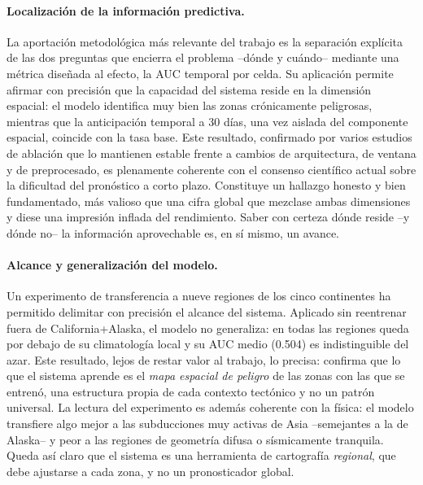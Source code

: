 \paragraph{Localización de la información predictiva.} La aportación metodológica más relevante
del trabajo es la separación explícita de las dos preguntas que encierra el problema --dónde y
cuándo-- mediante una métrica diseñada al efecto, la AUC temporal por celda. Su aplicación
permite afirmar con precisión que la capacidad del sistema reside en la dimensión espacial: el
modelo identifica muy bien las zonas crónicamente peligrosas, mientras que la anticipación
temporal a 30 días, una vez aislada del componente espacial, coincide con la tasa base. Este
resultado, confirmado por varios estudios de ablación que lo mantienen estable frente a cambios
de arquitectura, de ventana y de preprocesado, es plenamente coherente con el consenso
científico actual sobre la dificultad del pronóstico a corto plazo. Constituye un hallazgo
honesto y bien fundamentado, más valioso que una cifra global que mezclase ambas dimensiones y
diese una impresión inflada del rendimiento. Saber con certeza dónde reside --y dónde no-- la
información aprovechable es, en sí mismo, un avance.

\paragraph{Alcance y generalización del modelo.} Un experimento de transferencia a nueve regiones
de los cinco continentes ha permitido delimitar con precisión el alcance del sistema. Aplicado sin
reentrenar fuera de California+Alaska, el modelo no generaliza: en todas las regiones queda por
debajo de su climatología local y su AUC medio (0.504) es indistinguible del azar. Este resultado,
lejos de restar valor al trabajo, lo precisa: confirma que lo que el sistema aprende es el
\emph{mapa espacial de peligro} de las zonas con las que se entrenó, una estructura propia de cada
contexto tectónico y no un patrón universal. La lectura del experimento es además coherente con la
física: el modelo transfiere algo mejor a las subducciones muy activas de Asia --semejantes a la
de Alaska-- y peor a las regiones de geometría difusa o sísmicamente tranquila. Queda así claro
que el sistema es una herramienta de cartografía \emph{regional}, que debe ajustarse a cada zona,
y no un pronosticador global.


